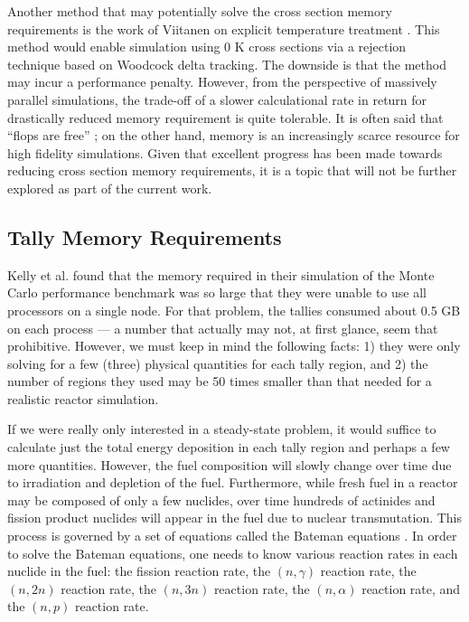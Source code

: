 Another method that may potentially solve the cross section memory requirements
is the work of Viitanen on explicit temperature treatment
\cite{nse-viitanen-2012, physor-viitanen-2012}. This method would enable
simulation using 0 K cross sections via a rejection technique based on Woodcock
delta tracking. The downside is that the method may incur a performance
penalty. However, from the perspective of massively parallel simulations, the
trade-off of a slower calculational rate in return for drastically reduced
memory requirement is quite tolerable. It is often said that ``flops are free''
\cite{sc-panel-2009}; on the other hand, memory is an increasingly scarce
resource for high fidelity simulations. Given that excellent progress has been
made towards reducing cross section memory requirements, it is a topic that will
not be further explored as part of the current work.

\subsection{Tally Memory Requirements}
\label{sec:tally-memory}

Kelly et al. \cite{physor-kelly-2012} found that the memory required in their
simulation of the Monte Carlo performance benchmark was so large that they were
unable to use all processors on a single node. For that problem, the tallies
consumed about 0.5 GB on each process --- a number that actually may not, at
first glance, seem that prohibitive. However, we must keep in mind the following
facts: 1) they were only solving for a few (three) physical quantities for each
tally region, and 2) the number of regions they used may be 50 times smaller
than that needed for a realistic reactor simulation.

If we were really only interested in a steady-state problem, it would suffice to
calculate just the total energy deposition in each tally region and perhaps a
few more quantities. However, the fuel composition will slowly change over time
due to irradiation and depletion of the fuel. Furthermore, while fresh fuel in a
reactor may be composed of only a few nuclides, over time hundreds of actinides
and fission product nuclides will appear in the fuel due to nuclear
transmutation. This process is governed by a set of equations called the Bateman
equations \cite{ane-cetnar-2006}. In order to solve the Bateman equations, one
needs to know various reaction rates in each nuclide in the fuel: the fission
reaction rate, the $(n,\gamma)$ reaction rate, the $(n,2n)$ reaction rate, the
$(n,3n)$ reaction rate, the $(n,\alpha)$ reaction rate, and the $(n,p)$ reaction
rate.

